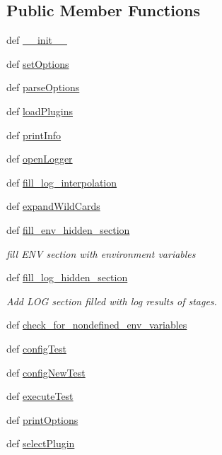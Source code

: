 \subsection*{Public Member Functions}
\begin{DoxyCompactItemize}
\item 
def \hyperlink{class_test_def_1_1_test_def_a8726684b78fbeb50a85915c6ff70050a}{\-\_\-\-\_\-init\-\_\-\-\_\-}
\item 
def \hyperlink{class_test_def_1_1_test_def_a65ffa863be5ebac4c4e6789e60377311}{set\-Options}
\item 
def \hyperlink{class_test_def_1_1_test_def_a35094bb7b74996ba7536ba5ec4df516b}{parse\-Options}
\item 
def \hyperlink{class_test_def_1_1_test_def_ae25d1dd3e674e2b0c2b1970e653ecfec}{load\-Plugins}
\item 
def \hyperlink{class_test_def_1_1_test_def_a8181c40f19ab55c7ba356d42c2fbbe5b}{print\-Info}
\item 
def \hyperlink{class_test_def_1_1_test_def_a3685bd47cb3be226c09d6737107dba04}{open\-Logger}
\item 
def \hyperlink{class_test_def_1_1_test_def_a1eef52449af7cd41049963ccbd8699c8}{fill\-\_\-log\-\_\-interpolation}
\item 
def \hyperlink{class_test_def_1_1_test_def_a605ae3c2e3fe97b7422683d0706c123f}{expand\-Wild\-Cards}
\item 
def \hyperlink{class_test_def_1_1_test_def_aad142866a4cedbc246741ef28c50ba07}{fill\-\_\-env\-\_\-hidden\-\_\-section}
\begin{DoxyCompactList}\small\item\em fill E\-N\-V section with environment variables \end{DoxyCompactList}\item 
def \hyperlink{class_test_def_1_1_test_def_a9c8dde4c0df8b567e33e3f792f7b87eb}{fill\-\_\-log\-\_\-hidden\-\_\-section}
\begin{DoxyCompactList}\small\item\em Add L\-O\-G section filled with log results of stages. \end{DoxyCompactList}\item 
def \hyperlink{class_test_def_1_1_test_def_a60a070c7b3fd512f31ce0b30090625c9}{check\-\_\-for\-\_\-nondefined\-\_\-env\-\_\-variables}
\item 
def \hyperlink{class_test_def_1_1_test_def_a2a10cd354fb5b287a8e6fa8a2d5e1915}{config\-Test}
\item 
def \hyperlink{class_test_def_1_1_test_def_a480ed48dbd7cf34cb2cbd8219999aaad}{config\-New\-Test}
\item 
def \hyperlink{class_test_def_1_1_test_def_a3eeef61386a154552981676b1893e59e}{execute\-Test}
\item 
def \hyperlink{class_test_def_1_1_test_def_a02bd5283e28743c874846f1c4c6bdf08}{print\-Options}
\item 
def \hyperlink{class_test_def_1_1_test_def_a2b517830435062cfa6c859ddce85ea81}{select\-Plugin}
\end{DoxyCompactItemize}
